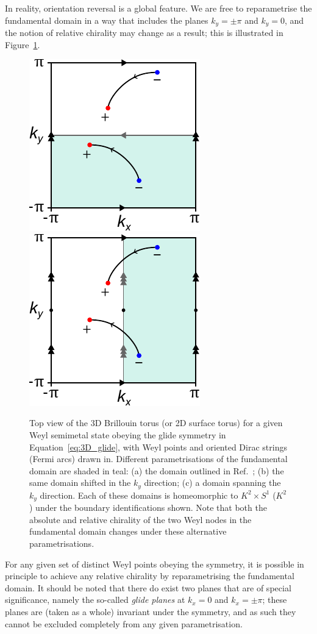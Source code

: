 In reality, orientation reversal is a global feature. We are free to reparametrise the fundamental domain in a way that includes the planes $k_y=\pm\pi$ and $k_y=0$, and the notion of relative chirality may change as a result; this is illustrated in Figure~\ref{fig:BZ_param}.
\begin{figure}[htb!]
	\centering
	 {\includegraphics[width=.3\textwidth]{Images/BZ_basic}}
	\hfil
	\hfil
	 {\includegraphics[width=.3\textwidth]{Images/BZ_right}}
	\caption{Top view of the 3D Brillouin torus (or 2D surface torus) for a given Weyl semimetal state obeying the glide symmetry in Equation~\eqref{eq:3D_glide}, with Weyl points and oriented Dirac strings (Fermi arcs) drawn in. Different parametrisations of the fundamental domain are shaded in teal: (a) the domain outlined in Ref.~\cite{Fonseca-Vaidya_nonorientable}; (b) the same domain shifted in the $k_y$ direction; (c) a domain spanning the $k_y$ direction. Each of these domains is homeomorphic to $K^2\times S^1$ ($K^2$) under the boundary identifications shown. Note that both the absolute and relative chirality of the two Weyl nodes in the fundamental domain changes under these alternative parametrisations.}
	\label{fig:BZ_param}
\end{figure}
For any given set of distinct Weyl points obeying the symmetry, it is possible in principle to achieve any relative chirality by reparametrising the fundamental domain. It should be noted that there do exist two planes that are of special significance, namely the so-called \emph{glide planes} at $k_x = 0$ and $k_x = \pm\pi$; these planes are (taken as a whole) invariant under the symmetry, and as such they cannot be excluded completely from any given parametrisation.


